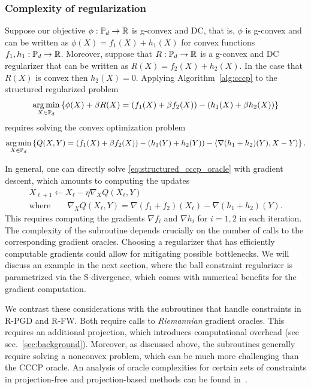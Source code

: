 \documentclass[sn-nature]{sn-jnl}%
\theoremstyle{thmstyleone}%
\theoremstyle{thmstyletwo}%
\theoremstyle{thmstylethree}%
\begin{document}
\subsubsection{Complexity of regularization}
Suppose our objective $\phi: \mathbb{P}_d \to \mathbb{R}$ is g-convex and DC, that is, $\phi$ is g-convex and can be written as $\phi(X) = f_1(X) + h_1(X)$ for convex functions $f_1, h_1: \mathbb{P}_d \to \mathbb{R}$. Moreover, suppose that $R:\mathbb{P}_d \to \mathbb{R}$ is a g-convex and DC regularizer that can be written as $R(X) = f_2(X) + h_2(X)$. In the case that $R(X)$ is convex then $h_2(X) = 0$.
Applying Algorithm~\ref{alg:cccp} to the structured regularized problem 
\[
\operatorname*{arg\,min}_{X \in \mathbb{P}_d} \left\{ \phi(X) + \beta R(X) = \left(f_1(X) + \beta f_2(X) \right) - \left(h_1(X) + \beta h_2(X)\right) \right\}
\]
requires solving the convex optimization problem 
\begin{equation}\label{eq:structured_cccp_oracle}
    \operatorname*{arg\,min}_{X \in \mathbb{P}_d} \left\{Q(X,Y) = \left(f_1(X) + \beta f_2(X) \right) - \left(h_1(Y) + h_2(Y) \right) - \langle \nabla (h_1 + h_2)(Y), X- Y \rangle  \right\}.
\end{equation}

In general, one can directly solve \eqref{eq:structured_cccp_oracle} with gradient descent, which amounts to computing the updates 
\begin{equation}\label{eq:}
\begin{gathered}
X_{\ell + 1} \leftarrow X_\ell - \eta \nabla_X Q(X_\ell, Y)
\\ \text{where} \qquad \nabla_X Q(X_\ell, Y) = \nabla (f_1 + f_2)(X_\ell) - \nabla (h_1 + h_2)(Y).
\end{gathered}    
\end{equation}
This requires computing the gradients $\nabla f_i$ and $\nabla h_i$ for $i = 1,2$ in each iteration. The complexity of the subroutine depends crucially on the number of calls to the corresponding gradient oracles. Choosing a regularizer that has efficiently computable gradients could allow for mitigating possible bottlenecks. We will discuss an example in the next section, where the ball constraint regularizer is parametrized via the S-divergence, which comes with numerical benefits for the gradient computation.

We contrast these considerations with the subroutines that handle constraints in R-PGD and R-FW. Both require calls to \emph{Riemannian} gradient oracles. This requires an additional projection, which introduces computational overhead (see sec.~\ref{sec:background}). Moreover, as discussed above, the subroutines generally require solving a nonconvex problem, which can be much more challenging than the CCCP oracle. An analysis of oracle complexities for certain sets of constraints in projection-free and projection-based methods can be found in~\citep{COMBETTES2021565,frank-wolfe,weber2021projection}.
\end{document}
